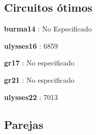 \documentclass[letterpaper,11pt]{article}
\begin{document}
 
 \subsection*{Circuitos \'otimos}
 
  \textbf{burma14} : No Especificado
  \newline
  
  \textbf{ulysses16} : 6859
  \newline
  
  \textbf{gr17} :  No especificado
  \newline
  
  \textbf{gr21} : No especificado
  \newline
  
  \textbf{ulysses22} : 7013
  \newline

\subsection*{Parejas}
 
\end{document}
